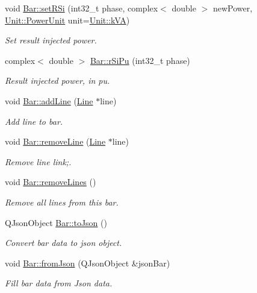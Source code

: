 \begin{DoxyCompactItemize}
void \hyperlink{group___models_ga36d3d54b66584a0557c0c141f4636d4c}{Bar\+::set\+R\+Si} (int32\+\_\+t phase, complex$<$ double $>$ new\+Power, \hyperlink{class_unit_ace265ae255370ccacfd5370337572c3b}{Unit\+::\+Power\+Unit} unit=\hyperlink{class_unit_ace265ae255370ccacfd5370337572c3ba72b181a842ae2759488a2fa1410d3696}{Unit\+::k\+V\+A})
\begin{DoxyCompactList}\small\item\em Set result injected power. \end{DoxyCompactList}\item 
complex$<$ double $>$ \hyperlink{group___models_ga1fa1b99d17dd19fafcf8309aba4fc758}{Bar\+::r\+Si\+Pu} (int32\+\_\+t phase)
\begin{DoxyCompactList}\small\item\em Result injected power, in pu. \end{DoxyCompactList}\item 
void \hyperlink{group___models_ga8cbd2f62d92e69ce6c8d561b682464b6}{Bar\+::add\+Line} (\hyperlink{class_line}{Line} $\ast$line)
\begin{DoxyCompactList}\small\item\em Add line to bar. \end{DoxyCompactList}\item 
void \hyperlink{group___models_ga2536c0e5cb97fb627b3520826ece2c99}{Bar\+::remove\+Line} (\hyperlink{class_line}{Line} $\ast$line)
\begin{DoxyCompactList}\small\item\em Remove line link;. \end{DoxyCompactList}\item 
void \hyperlink{group___models_ga4ea1a2074cb45968d80d6add571884a4}{Bar\+::remove\+Lines} ()
\begin{DoxyCompactList}\small\item\em Remove all lines from this bar. \end{DoxyCompactList}\item 
Q\+Json\+Object \hyperlink{group___models_ga3eb84c42b687db6cd98e11b8bd38c86e}{Bar\+::to\+Json} ()
\begin{DoxyCompactList}\small\item\em Convert bar data to json object. \end{DoxyCompactList}\item 
void \hyperlink{group___models_ga1df62f03dd3a066ceaf6588ba6bb6004}{Bar\+::from\+Json} (Q\+Json\+Object \&json\+Bar)
\begin{DoxyCompactList}\small\item\em Fill bar data from Json data. \end{DoxyCompactList}\item 

\end{DoxyCompactItemize}
